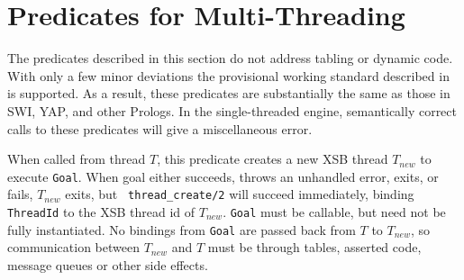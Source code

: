 \section{Predicates for Multi-Threading} \label{sec:mt-threading}

The predicates described in this section do not address tabling or
dynamic code.  With only a few minor deviations the provisional
working standard described in \cite{Prolog-MT-ISO} is supported.  As a
result, these predicates are substantially the same as those in SWI,
YAP, and other Prologs.  In the single-threaded engine, semantically
correct calls to these predicates will give a miscellaneous error.

\begin{description}

%
When called from thread $T$, this predicate creates a new XSB thread
$T_{new}$ to execute {\tt Goal}.  When goal either succeeds, throws an
unhandled error, exits, or fails, $T_{new}$ exits, but {\tt
  thread\_create/2} will succeed immediately, binding {\tt ThreadId}
to the XSB thread id of $T_{new}$.  {\tt Goal} must be callable, but
need not be fully instantiated.  No bindings from {\tt Goal} are
passed back from $T$ to $T_{new}$, so communication between $T_{new}$
and $T$ must be through tables, asserted code, message queues or other
side effects.


\end{description}

